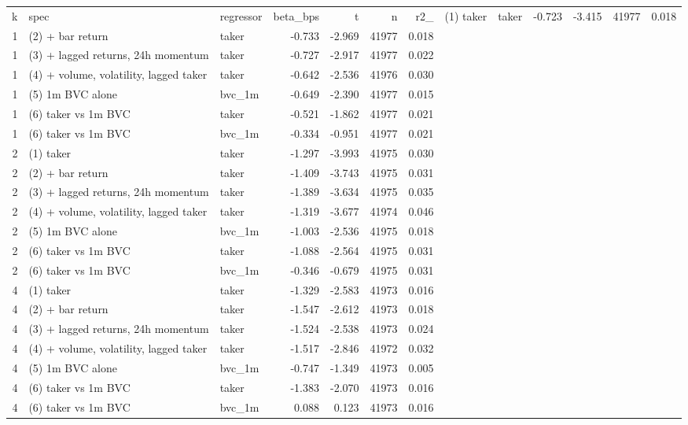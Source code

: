 \begin{tabular}{rllrrrr}
\toprule
k & spec & regressor & beta_bps & t & n & r2_%
 & (1) taker & taker & -0.723 & -3.415 & 41977 & 0.018 \\
1 & (2) + bar return & taker & -0.733 & -2.969 & 41977 & 0.018 \\
1 & (3) + lagged returns, 24h momentum & taker & -0.727 & -2.917 & 41977 & 0.022 \\
1 & (4) + volume, volatility, lagged taker & taker & -0.642 & -2.536 & 41976 & 0.030 \\
1 & (5) 1m BVC alone & bvc_1m & -0.649 & -2.390 & 41977 & 0.015 \\
1 & (6) taker vs 1m BVC & taker & -0.521 & -1.862 & 41977 & 0.021 \\
1 & (6) taker vs 1m BVC & bvc_1m & -0.334 & -0.951 & 41977 & 0.021 \\
2 & (1) taker & taker & -1.297 & -3.993 & 41975 & 0.030 \\
2 & (2) + bar return & taker & -1.409 & -3.743 & 41975 & 0.031 \\
2 & (3) + lagged returns, 24h momentum & taker & -1.389 & -3.634 & 41975 & 0.035 \\
2 & (4) + volume, volatility, lagged taker & taker & -1.319 & -3.677 & 41974 & 0.046 \\
2 & (5) 1m BVC alone & bvc_1m & -1.003 & -2.536 & 41975 & 0.018 \\
2 & (6) taker vs 1m BVC & taker & -1.088 & -2.564 & 41975 & 0.031 \\
2 & (6) taker vs 1m BVC & bvc_1m & -0.346 & -0.679 & 41975 & 0.031 \\
4 & (1) taker & taker & -1.329 & -2.583 & 41973 & 0.016 \\
4 & (2) + bar return & taker & -1.547 & -2.612 & 41973 & 0.018 \\
4 & (3) + lagged returns, 24h momentum & taker & -1.524 & -2.538 & 41973 & 0.024 \\
4 & (4) + volume, volatility, lagged taker & taker & -1.517 & -2.846 & 41972 & 0.032 \\
4 & (5) 1m BVC alone & bvc_1m & -0.747 & -1.349 & 41973 & 0.005 \\
4 & (6) taker vs 1m BVC & taker & -1.383 & -2.070 & 41973 & 0.016 \\
4 & (6) taker vs 1m BVC & bvc_1m & 0.088 & 0.123 & 41973 & 0.016 \\
\bottomrule
\end{tabular}
